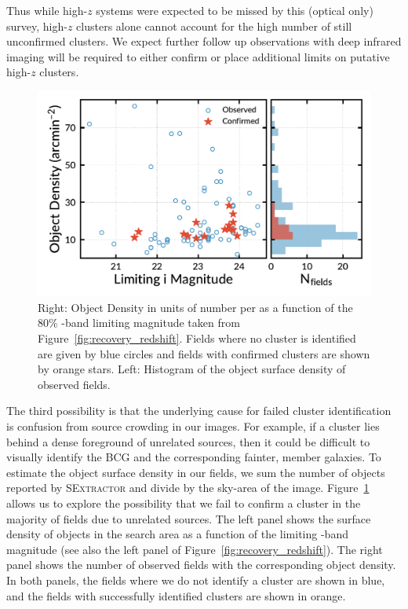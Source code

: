 \documentclass[apj, revtex4-1]{emulateapj}
\begin{document}
Thus while high-$z$ systems were expected to be missed by this (optical only) survey, high-$z$ clusters alone cannot account for the high number of still unconfirmed clusters. We expect further follow up observations with deep infrared imaging will be required to either confirm or place additional limits on putative high-$z$ clusters.

\begin{figure}
	\includegraphics[width=\columnwidth]{N_vs_density.pdf}
	\caption{Right: Object Density in units of number per \arcminsq as a function of the 80\% \sdssi-band limiting magnitude taken from Figure~\ref{fig:recovery_redshift}. Fields where no cluster is identified are given by blue circles and fields with confirmed clusters are shown by orange stars. Left: Histogram of the object surface density of observed fields.}
	\label{fig:N_vs_density}
\end{figure}

The third possibility is that the underlying cause for failed cluster identification is confusion from source crowding in our images. For example, if a cluster lies behind a dense foreground of unrelated sources, then it could be difficult to visually identify the BCG and the corresponding fainter, member galaxies. To estimate the object surface density in our fields, we sum the number of objects reported by \textsc{SExtractor} and divide by the sky-area of the image. Figure~\ref{fig:N_vs_density} allows us to explore the possibility that we fail to confirm a cluster in the majority of fields due to unrelated sources. The left panel shows the surface density of objects in the search area as a function of the limiting \sdssi-band magnitude (see also the left panel of Figure~\ref{fig:recovery_redshift}). The right panel shows the number of observed fields with the corresponding object density. In both panels, the fields where we do not identify a cluster are shown in blue, and the fields with successfully identified clusters are shown in orange.
\end{document}
